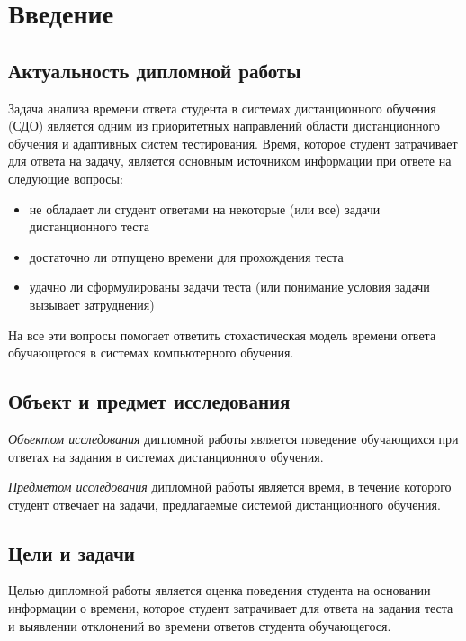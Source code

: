 \chapter{Введение}

\label{intr}
\section{Актуальность дипломной работы}
Задача анализа времени ответа студента в системах дистанционного обу\-чения (СДО) является одним из приоритетных направлений области дистан\-ционного обучения и адаптивных систем тестирования. 
Время, которое студент затрачивает для ответа на задачу, является основным источником информации при ответе на следующие вопросы:
\begin{itemize}
\item не обладает ли студент ответами на некоторые (или все) задачи дистанци\-онного теста
\item достаточно ли отпущено времени для прохождения теста
\item удачно ли сформулированы задачи теста (или понимание условия задачи вызывает затруднения)
\end{itemize}

На все эти вопросы помогает ответить стохастическая модель времени ответа \\обучающегося в системах компьютерного обучения.

\section{Объект и предмет исследования}
{\itshape Объектом исследования} дипломной работы является поведение обуча\-ющихся при ответах на задания в системах дистанционного обучения. 

{\itshape Предметом исследования} дипломной работы является время, в течение которого студент отвечает на задачи, предлагаемые системой дистанционного обучения. 

\section{Цели и задачи}

Целью дипломной работы является оценка поведения студента на основании информа\-ции о времени, которое студент затрачивает для ответа на задания теста и выявлении отклонений во времени ответов студента обучающегося.

